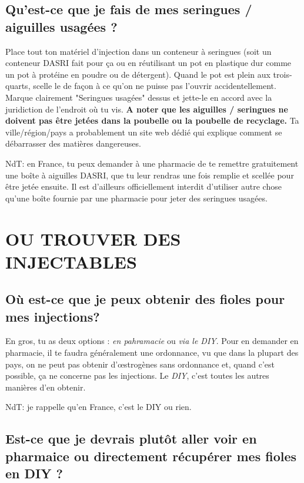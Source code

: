 \documentclass{article}
\begin{document}
\subsection{Qu'est-ce que je fais de mes seringues / aiguilles usagées ?}\label{5-27}

Place tout ton matériel d'injection dans un conteneur à seringues (soit un conteneur DASRI fait pour ça ou en réutilisant un pot en plastique dur comme un pot à protéine en poudre ou de détergent). Quand le pot est plein aux trois-quarts, scelle le de façon à ce qu'on ne puisse pas l'ouvrir accidentellement. Marque clairement "Seringues usagées" dessus et jette-le en accord avec la juridiction de l'endroit où tu vis. \textbf{A noter que les aiguilles / seringues ne doivent pas être jetées dans la poubelle ou la poubelle de recyclage.} Ta ville/région/pays a probablement un site web dédié qui explique comment se débarrasser des matières dangereuses.

NdT: en France, tu peux demander à une pharmacie de te remettre gratuitement une boîte à aiguilles DASRI, que tu leur rendras une fois remplie et scellée pour être jetée ensuite. Il est d'ailleurs officiellement interdit d'utiliser autre chose qu'une boîte fournie par une pharmacie pour jeter des seringues usagées.

\section{OU TROUVER DES INJECTABLES}\label{sv}

\subsection{Où est-ce que je peux obtenir des fioles pour mes injections?}

En gros, tu as deux options : \textit{en pahramacie} ou \textit{via le DIY}. Pour en demander en pharmacie, il te faudra généralement une ordonnance, vu que dans la plupart des pays, on ne peut pas obtenir d'œstrogènes sans ordonnance et, quand c'est possible, ça ne concerne pas les injections. Le \textit{DIY}, c'est toutes les autres manières d'en obtenir.

NdT: je rappelle qu'en France, c'est le DIY ou rien.

\subsection{Est-ce que je devrais plutôt aller voir en pharmaice ou directement récupérer mes fioles en DIY ?}
\end{document}
